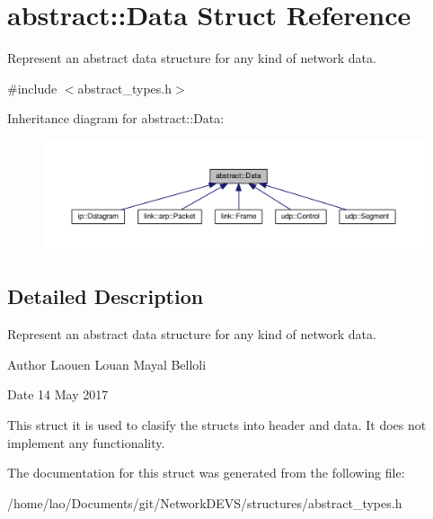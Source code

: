 \hypertarget{structabstract_1_1Data}{}\section{abstract\+:\+:Data Struct Reference}
\label{structabstract_1_1Data}


Represent an abstract data structure for any kind of network data.  




{\ttfamily \#include $<$abstract\+\_\+types.\+h$>$}



Inheritance diagram for abstract\+:\+:Data\+:\nopagebreak
\begin{figure}[H]
\begin{center}
\leavevmode
\includegraphics[width=350pt]{structabstract_1_1Data__inherit__graph}
\end{center}
\end{figure}


\subsection{Detailed Description}
Represent an abstract data structure for any kind of network data. 

\begin{DoxyAuthor}{Author}
Laouen Louan Mayal Belloli 
\end{DoxyAuthor}
\begin{DoxyDate}{Date}
14 May 2017
\end{DoxyDate}
This struct it is used to clasify the structs into header and data. It does not implement any functionality. 

The documentation for this struct was generated from the following file\+:\begin{DoxyCompactItemize}
\item 
/home/lao/\+Documents/git/\+Network\+D\+E\+V\+S/structures/abstract\+\_\+types.\+h\end{DoxyCompactItemize}
